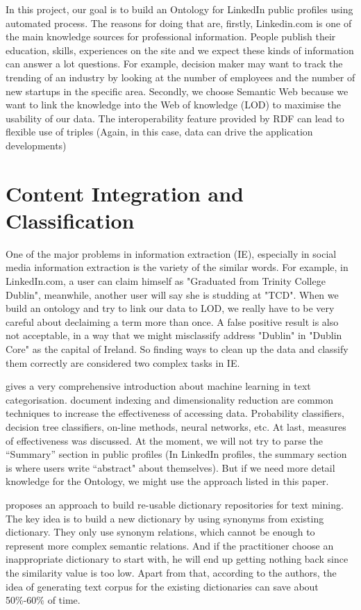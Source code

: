In this project, our goal is to build an Ontology for LinkedIn public profiles using automated process. The reasons for doing that are, firstly, Linkedin.com is one of the main knowledge sources for professional information. People publish their education, skills, experiences on the site and we expect these kinds of information can answer a lot questions. For example, decision maker may want to track the trending of an industry by looking at the number of employees and the number of new startups in the specific area. Secondly, we choose Semantic Web because we want to link the knowledge into the Web of knowledge (LOD) to maximise the usability of our data.  The interoperability feature provided by RDF can lead to flexible use of triples (Again, in this case, data can drive the application developments)

\section{Content Integration and Classification}

One of the major problems in information extraction (IE), especially in social media information extraction is the variety of the similar words. For example,  in LinkedIn.com, a user can claim himself as "Graduated from Trinity College Dublin", meanwhile, another user will say she is studding at "TCD". When we build an ontology and try to link our data to LOD, we really have to be very careful about declaiming a term more than once. A false positive result is also not acceptable, in a way that we might misclassify address "Dublin" in "Dublin Core" as the capital of Ireland. So finding ways to clean up the data and classify them correctly are considered two complex tasks in IE.

\cite{sebastiani2002} gives a very comprehensive introduction about machine learning in text categorisation. document indexing and dimensionality reduction are common techniques to increase the effectiveness of accessing data. Probability classifiers, decision tree classifiers, on-line methods, neural networks, etc. At last, measures of effectiveness was discussed. At the moment, we will not try to parse the ``Summary'' section in public profiles (In LinkedIn profiles, the summary section is where users write ``abstract" about themselves). But if we need more detail knowledge for the Ontology, we might use the approach listed in this paper.

\cite{godbole2010} proposes an approach to build re-usable dictionary repositories for text mining. The key idea is to build a new dictionary by using synonyms from existing dictionary. They only use synonym relations, which cannot be enough to represent more complex semantic relations. And if the practitioner choose an inappropriate dictionary to start with, he will end up getting nothing back since the similarity value is too low. Apart from that, according to the authors, the idea of generating text corpus for the existing dictionaries can save about 50\%-60\% of time.

